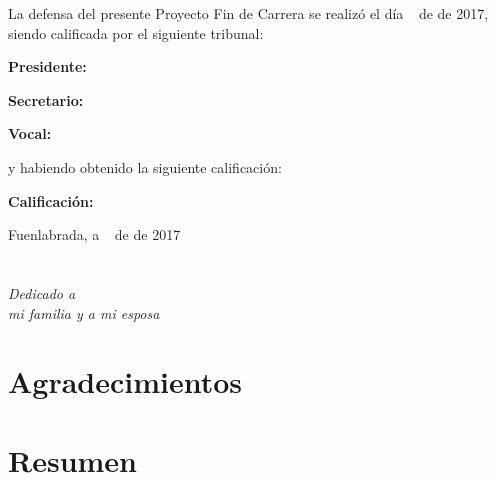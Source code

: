 \documentclass[a4paper, 12pt]{book}
\begin{document}
\vspace{1cm}
La defensa del presente Proyecto Fin de Carrera se realizó el día \qquad$\;\,$ de \qquad\qquad\qquad\qquad \newline de 2017, siendo calificada por el siguiente tribunal:


\vspace{0.5cm}
\textbf{Presidente:}

\vspace{1.2cm}
\textbf{Secretario:}

\vspace{1.2cm}
\textbf{Vocal:}


\vspace{1.2cm}
y habiendo obtenido la siguiente calificación:

\vspace{1cm}
\textbf{Calificación:}


\vspace{1cm}
\begin{flushright}
Fuenlabrada, a \qquad$\;\,$ de \qquad\qquad\qquad\qquad de 2017
\end{flushright}


\chapter*{}
\begin{flushright}
\textit{Dedicado a \\
mi familia y a mi esposa}
\end{flushright}


\chapter*{Agradecimientos}



\chapter*{Resumen}
\end{document}
